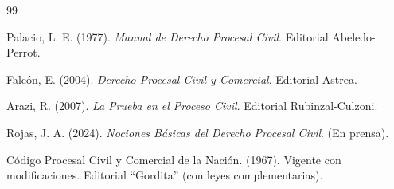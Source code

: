 \documentclass[12pt,oneside]{book}
\begin{document}
\begin{thebibliography}{99}

 Palacio, L. E. (1977). \textit{Manual de Derecho Procesal Civil}. Editorial Abeledo-Perrot.

 Falcón, E. (2004). \textit{Derecho Procesal Civil y Comercial}. Editorial Astrea.

 Arazi, R. (2007). \textit{La Prueba en el Proceso Civil}. Editorial Rubinzal-Culzoni.

 Rojas, J. A. (2024). \textit{Nociones Básicas del Derecho Procesal Civil}. (En prensa).

 Código Procesal Civil y Comercial de la Nación. (1967). Vigente con modificaciones. Editorial ``Gordita'' (con leyes complementarias).

\end{thebibliography}

\end{document}
